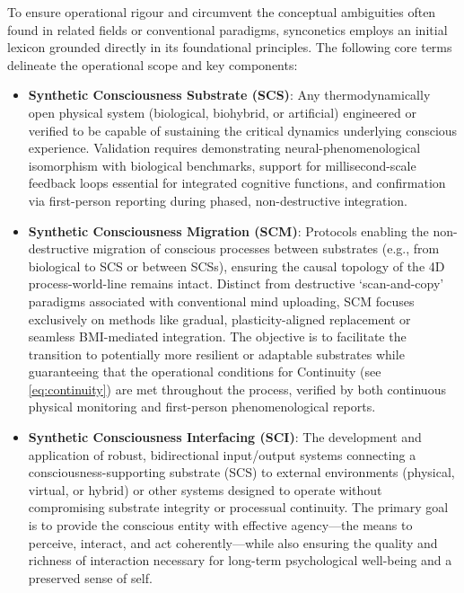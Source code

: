 \documentclass[10pt]{article}
\begin{document}
\begin{sloppypar}
  To ensure operational rigour and circumvent the conceptual ambiguities often found in related fields or conventional paradigms, synconetics employs an initial lexicon grounded directly in its foundational principles. The following core terms delineate the operational scope and key components:

  \begin{itemize}
    \item \textbf{Synthetic Consciousness Substrate (SCS)}: Any thermodynamically open physical system (biological, biohybrid, or artificial) engineered or verified to be capable of sustaining the critical dynamics underlying conscious experience. Validation requires demonstrating neural-phenomenological isomorphism with biological benchmarks, support for millisecond-scale feedback loops essential for integrated cognitive functions, and confirmation via first-person reporting during phased, non-destructive integration.

    \item \textbf{Synthetic Consciousness Migration (SCM)}: Protocols enabling the non-destructive migration of conscious processes between substrates (e.g., from biological to SCS or between SCSs), ensuring the causal topology of the 4D process-world-line remains intact. Distinct from destructive ‘scan-and-copy’ paradigms associated with conventional mind uploading, SCM focuses exclusively on methods like gradual, plasticity-aligned replacement or seamless BMI-mediated integration. The objective is to facilitate the transition to potentially more resilient or adaptable substrates while guaranteeing that the operational conditions for Continuity (see \autoref{eq:continuity}) are met throughout the process, verified by both continuous physical monitoring and first-person phenomenological reports.

    \item \textbf{Synthetic Consciousness Interfacing (SCI)}: The development and application of robust, bidirectional input/output systems connecting a consciousness-supporting substrate (SCS) to external environments (physical, virtual, or hybrid) or other systems designed to operate without compromising substrate integrity or processual continuity. The primary goal is to provide the conscious entity with effective agency—the means to perceive, interact, and act coherently—while also ensuring the quality and richness of interaction necessary for long-term psychological well-being and a preserved sense of self.


\end{itemize}
\end{sloppypar}
\end{document}
